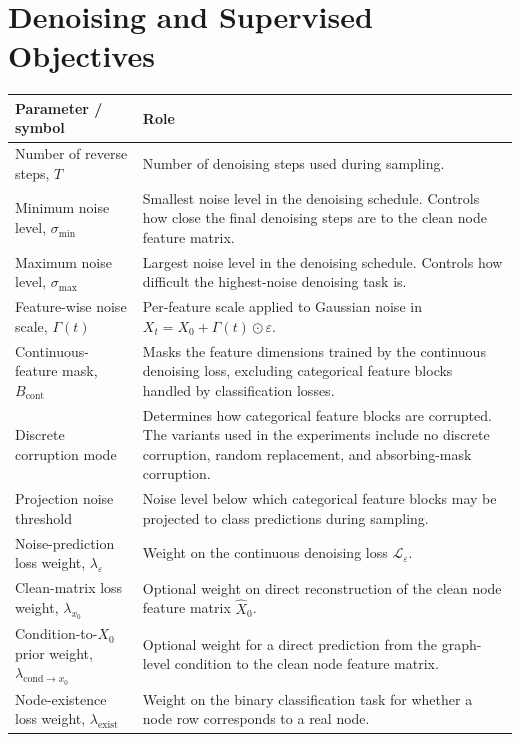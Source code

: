 \section{Denoising and Supervised Objectives}

\begin{table}[p]
\centering
\footnotesize
\begin{tabularx}{\textwidth}{@{}p{}X@{}}
\toprule
Parameter / symbol & Role \\
\midrule
Number of reverse steps, \(T\) & Number of denoising steps used during sampling. \\
Minimum noise level, \(\sigma_{\min}\) & Smallest noise level in the denoising schedule. Controls how close the final denoising steps are to the clean node feature matrix. \\
Maximum noise level, \(\sigma_{\max}\) & Largest noise level in the denoising schedule. Controls how difficult the highest-noise denoising task is. \\
Feature-wise noise scale, \(\Gamma(t)\) & Per-feature scale applied to Gaussian noise in \(X_t=X_0+\Gamma(t)\odot\varepsilon\). \\
Continuous-feature mask, \(B_{\mathrm{cont}}\) & Masks the feature dimensions trained by the continuous denoising loss, excluding categorical feature blocks handled by classification losses. \\
Discrete corruption mode & Determines how categorical feature blocks are corrupted. The variants used in the experiments include no discrete corruption, random replacement, and absorbing-mask corruption. \\
Projection noise threshold & Noise level below which categorical feature blocks may be projected to class predictions during sampling. \\
Noise-prediction loss weight, \(\lambda_{\varepsilon}\) & Weight on the continuous denoising loss \(\mathcal{L}_{\varepsilon}\). \\
Clean-matrix loss weight, \(\lambda_{x_0}\) & Optional weight on direct reconstruction of the clean node feature matrix \(\hat{X}_0\). \\
Condition-to-\(X_0\) prior weight, \(\lambda_{\mathrm{cond}\to x_0}\) & Optional weight for a direct prediction from the graph-level condition to the clean node feature matrix. \\
Node-existence loss weight, \(\lambda_{\mathrm{exist}}\) & Weight on the binary classification task for whether a node row corresponds to a real node. \\

\end{tabularx}
\end{table}
